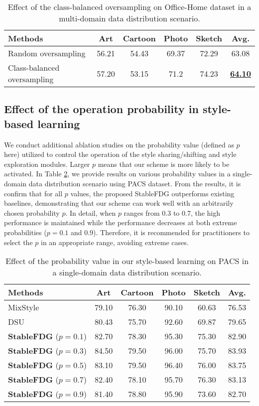 \documentclass{article}
\theoremstyle{plain}
\theoremstyle{definition}
\theoremstyle{remark}
\begin{document}
\begin{table}[!h]
\small
\centering
	\begin{tabular}{l|    cccc | c}
		\toprule  
		Methods   &Art  & Cartoon & Photo & Sketch & Avg. \\ 
		\midrule	
		Random oversampling  &56.21&54.43&69.37&72.29 &63.08  \\	
	 Class-balanced oversampling & 57.20&53.15&71.2&74.23& \textbf{\underline{64.10}}  \\
		\bottomrule
	\end{tabular}
\vspace{+3mm}
\caption{Effect of the class-balanced oversampling on Office-Home dataset in a multi-domain data distribution scenario. } 
\label{table:sm2}
\end{table}  

\subsection{Effect of the operation probability   in  style-based learning}
We conduct additional ablation studies on the probability value (defined as $p$ here) utilized to control the operation of the style sharing/shifting and style exploration modules. Larger  $p$ means that our scheme is more likely  to be activated.  In Table \ref{table:sm0}, we provide results on various probability values in a single-domain data distribution scenario using PACS dataset. From the results, it is confirm that for all $p$ values, the proposed StableFDG outperforms   existing baselines, demonstrating that our scheme can work well with an arbitrarily chosen probability $p$. In detail, when $p$ ranges from 0.3 to 0.7, the high performance is maintained while the performance decreases at both extreme probabilities ($p=0.1$ and 0.9). Therefore, it is recommended for practitioners to select the $p$ in an appropriate range, avoiding extreme cases.

\begin{table}[!h]
\small
\centering
	\begin{tabular}{l|    cccc | c}
		\toprule  
		Methods   &Art  & Cartoon & Photo & Sketch & Avg. \\ 
		\midrule		
		MixStyle \cite{zhou2021domain}   & 79.10&76.30&90.10&60.63&76.53  \\
		DSU  \cite{li2022uncertainty} & 80.43	&75.70	&92.60&	69.87&	79.65 \\
		\textbf{StableFDG} ($p=0.1$)  &82.70&78.30&95.30&75.30&82.90  \\
	   	\textbf{StableFDG} ($p=0.3$)  & 84.50&79.50&96.00&75.70&  83.93   \\
		\textbf{StableFDG} ($p=0.5$)  & 83.10&79.50&96.40&76.00&83.75  \\
		\textbf{StableFDG} ($p=0.7$)  & 82.40&78.10&95.70&76.30&83.13  \\
		\textbf{StableFDG} ($p=0.9$)  & 81.40&78.80&95.90&73.60&82.70 \\
		\bottomrule
	\end{tabular}
\vspace{+3mm}
\caption{Effect of the probability value in our style-based learning on PACS in a single-domain data distribution scenario.} 
\label{table:sm0}
\end{table}
\end{document}
